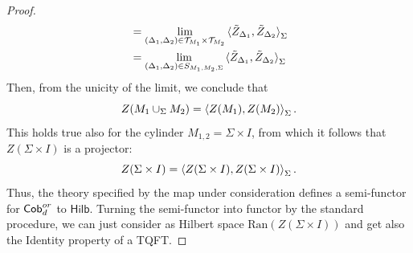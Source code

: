 \documentclass[10pt,a4paper]{amsart}
\begin{document}
\begin{proof}
\begin{align*}
    &=\lim_{(\Delta_1,\Delta_2)\in\mathcal{T}_{M_1}\times\mathcal{T}_{M_2}}\braket{\tilde{Z}_{\Delta_1},\tilde{Z}_{\Delta_2}}_{\Sigma}\\
    &=\lim_{(\Delta_1,\Delta_2)\in S_{M_1,M_2,\Sigma}}\braket{\tilde{Z}_{\Delta_1},\tilde{Z}_{\Delta_2}}_{\Sigma}
\end{align*}
Then, from the unicity of the limit, we conclude that
\[Z(M_1\cup_{\Sigma}M_2)=\braket{Z(M_1),Z(M_2)}_{\Sigma}.\]
This holds true also for the cylinder $M_{1,2}=\Sigma\times I$, from which it follows that $Z(\Sigma\times I)$ is a projector: 
\[Z(\Sigma\times I)=\braket{Z(\Sigma\times I),Z(\Sigma\times I)}_{\Sigma}.\]
Thus, the theory specified by the map under consideration defines a semi-functor for $\mathsf{Cob}_{\rm d}^{\rm or}$ to $\mathsf{Hilb}$. Turning the semi-functor into functor by the standard procedure, we can just consider as Hilbert space $\mathrm{Ran}(Z(\Sigma\times I))$ and get also the Identity property of a TQFT.
\end{proof}
\end{document}
